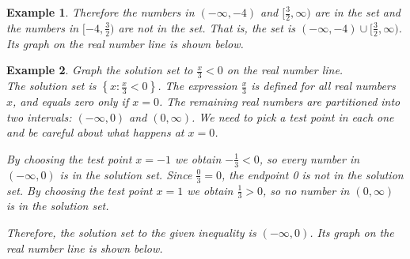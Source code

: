 \documentclass[11pt]{book}               %
\newtheorem{example}{Example}
\begin{document}
\begin{example}
Therefore the numbers in $(-\infty,-4)$ and $[\frac{3}{2},\infty)$ are in the set and the numbers in $[-4,\frac{3}{2})$ are not in the set.   
That is, the set is  $(-\infty,-4) \cup [\frac{3}{2},\infty)$.
Its graph on the real number line is shown below.

\begin{center}
\end{center}
\end{example}


\begin{example}
 Graph the solution set to $ \frac{x}{3} < 0 $ on the real number line. \\

\normalfont
The solution set is $\left\{x: \frac{x}{3} < 0\right\}$.
The expression $\frac{x}{3}$ is defined for all real numbers $x$, and equals zero only if $x = 0$.
The remaining real numbers are partitioned into two intervals: $(-\infty, 0)$ and $(0, \infty)$.  
We need to pick a test point in each one and be careful about what happens at $x = 0$.

By choosing the test point $x = -1$ we obtain $-\frac{1}{3} < 0$, so every number in $(-\infty, 0)$ 
is in the solution set.  Since $\frac{0}{3} = 0$, the endpoint 0 is not in the solution set.
By choosing the test point $x = 1$ we obtain $\frac{1}{3} > 0$, so  no number in $(0, \infty)$ 
is in the solution set. 

Therefore, the solution set to the given inequality is $(-\infty, 0)$.  Its graph on the real
number line is shown below.

\begin{center}
\end{center}
\end{example}
\end{document}
